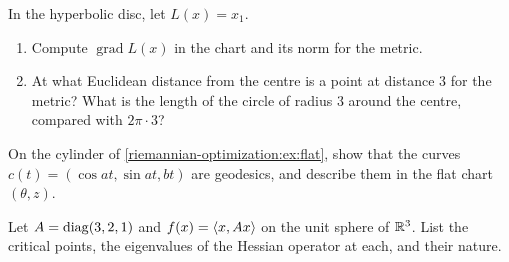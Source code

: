 \begin{notechapter}
\begin{exercise}\label{riemannian-optimization:exr:7}
In the hyperbolic disc, let $L(x) = x_1$.
\begin{enumerate}[nosep]
  \item Compute $\operatorname{grad}L(x)$ in the chart and its norm for
        the metric.
  \item At what Euclidean distance from the centre is a point at
        distance $3$ for the metric? What is the length of the circle of
        radius $3$ around the centre, compared with $2\pi\cdot3$?
\end{enumerate}
\end{exercise}

\begin{exercise}\label{riemannian-optimization:exr:8}
On the cylinder of \cref{riemannian-optimization:ex:flat}, show that the
curves $c(t) = (\cos at, \sin at, bt)$ are geodesics, and describe them
in the flat chart $(\theta, z)$.
\end{exercise}

\begin{exercise}\label{riemannian-optimization:exr:9}
Let $A = \operatorname{diag}(3, 2, 1)$ and $f(x) = \left\langle x, Ax \right\rangle$ on the unit sphere of
$\mathbb{R}^3$. List the critical points, the eigenvalues of the Hessian
operator at each, and their nature.
\end{exercise}
\end{notechapter}

